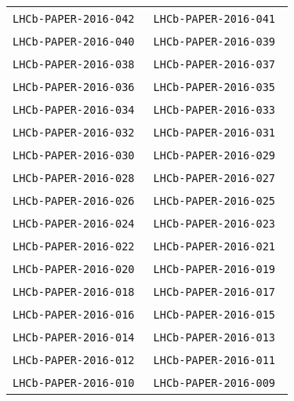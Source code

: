 \begin{center}
\begin{longtable}{ll}
\texttt{LHCb-PAPER-2016-042}~\cite{LHCb-PAPER-2016-042} & 
\texttt{LHCb-PAPER-2016-041}~\cite{LHCb-PAPER-2016-041} \\
\texttt{LHCb-PAPER-2016-040}~\cite{LHCb-PAPER-2016-040} & 
\texttt{LHCb-PAPER-2016-039}~\cite{LHCb-PAPER-2016-039} \\
\texttt{LHCb-PAPER-2016-038}~\cite{LHCb-PAPER-2016-038} & 
\texttt{LHCb-PAPER-2016-037}~\cite{LHCb-PAPER-2016-037} \\
\texttt{LHCb-PAPER-2016-036}~\cite{LHCb-PAPER-2016-036} & 
\texttt{LHCb-PAPER-2016-035}~\cite{LHCb-PAPER-2016-035} \\
\texttt{LHCb-PAPER-2016-034}~\cite{LHCb-PAPER-2016-034} & 
\texttt{LHCb-PAPER-2016-033}~\cite{LHCb-PAPER-2016-033} \\
\texttt{LHCb-PAPER-2016-032}~\cite{LHCb-PAPER-2016-032} & 
\texttt{LHCb-PAPER-2016-031}~\cite{LHCb-PAPER-2016-031} \\
\texttt{LHCb-PAPER-2016-030}~\cite{LHCb-PAPER-2016-030} & 
\texttt{LHCb-PAPER-2016-029}~\cite{LHCb-PAPER-2016-029} \\
\texttt{LHCb-PAPER-2016-028}~\cite{LHCb-PAPER-2016-028} & 
\texttt{LHCb-PAPER-2016-027}~\cite{LHCb-PAPER-2016-027} \\
\texttt{LHCb-PAPER-2016-026}~\cite{LHCb-PAPER-2016-026} &
\texttt{LHCb-PAPER-2016-025}~\cite{LHCb-PAPER-2016-025} \\
\texttt{LHCb-PAPER-2016-024}~\cite{LHCb-PAPER-2016-024} &
\texttt{LHCb-PAPER-2016-023}~\cite{LHCb-PAPER-2016-023} \\
\texttt{LHCb-PAPER-2016-022}~\cite{LHCb-PAPER-2016-022} &
\texttt{LHCb-PAPER-2016-021}~\cite{LHCb-PAPER-2016-021} \\
\texttt{LHCb-PAPER-2016-020}~\cite{LHCb-PAPER-2016-020} &
\texttt{LHCb-PAPER-2016-019}~\cite{LHCb-PAPER-2016-019} \\
\texttt{LHCb-PAPER-2016-018}~\cite{LHCb-PAPER-2016-018} &
\texttt{LHCb-PAPER-2016-017}~\cite{LHCb-PAPER-2016-017} \\
\texttt{LHCb-PAPER-2016-016}~\cite{LHCb-PAPER-2016-016} &
\texttt{LHCb-PAPER-2016-015}~\cite{LHCb-PAPER-2016-015} \\
\texttt{LHCb-PAPER-2016-014}~\cite{LHCb-PAPER-2016-014} &
\texttt{LHCb-PAPER-2016-013}~\cite{LHCb-PAPER-2016-013} \\
\texttt{LHCb-PAPER-2016-012}~\cite{LHCb-PAPER-2016-012} &
\texttt{LHCb-PAPER-2016-011}~\cite{LHCb-PAPER-2016-011} \\
\texttt{LHCb-PAPER-2016-010}~\cite{LHCb-PAPER-2016-010} &
\texttt{LHCb-PAPER-2016-009}~\cite{LHCb-PAPER-2016-009} \\

\end{longtable}
\end{center}
